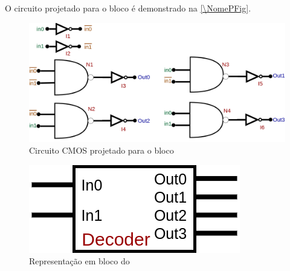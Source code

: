 O circuito projetado para o bloco \'e demonstrado na \autoref{\NomePFig}.

\begin{figure}[htbp]
 \label{NomePFig}
 \centering
    \centering
    \caption{Circuito CMOS projetado para o bloco \NomeBloco} \label{\NomePFig}
    \includegraphics[scale=0.3]{Circuitos/decoder.png}
\end{figure}

\begin{figure}[htbp]
 \label{NomeSFig}
 \centering
    \centering
    \caption{Representa{\c c}\~ao em bloco do \NomeBloco} \label{NomeSFig}
    \includegraphics[scale=0.3]{Circuitos/decoder_block.png}
\end{figure}